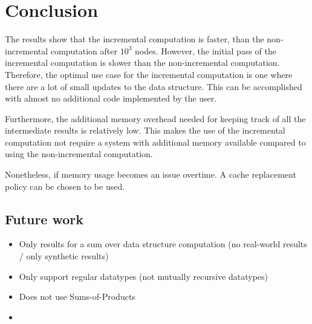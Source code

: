 \chapter{Conclusion}

The results show that the incremental computation is faster, than the non-incremental computation after $10^3$ nodes. However, the initial pass of the incremental computation is slower than the non-incremental computation. Therefore, the optimal use case for the incremental computation is one where there are a lot of small updates to the data structure. This can be accomplished with almost no additional code implemented by the user. 

Furthermore, the additional memory overhead needed for keeping track of all the intermediate results is relatively low. This makes the use of the incremental computation not require a system with additional memory available compared to using the non-incremental computation. 

Nonetheless, if memory usage becomes an issue overtime. A cache replacement policy can be chosen to be used. 


\section{Future work}

\begin{itemize}
  \item Only results for a sum over data structure computation (no real-world results / only synthetic results)
  \item Only support regular datatypes (not mutually recursive datatypes)
  \item Does not use Sums-of-Products
  \item 
\end{itemize}